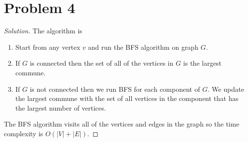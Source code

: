 \documentclass[12pt]{article}
\newenvironment*{solution}{\begin{proof}[Solution]}{\end{proof}}
\begin{document}
\section*{Problem 4}
\begin{solution}
    The algorithm is
    \begin{enumerate}
        \item Start from any vertex \(v\) and run the BFS algorithm on graph
        \(G\).
        \item If \(G\) is connected then the set of all of the vertices in
        \(G\) is the largest commune.
        \item If \(G\) is not connected then we run BFS for each component of
        \(G\). We update the largest commune with the set of all vertices in
        the component that has the largest number of vertices.
    \end{enumerate}
    The BFS algorithm visits all of the vertices and edges in the graph so the
    time complexity is \(O(|V|+|E|)\).
\end{solution}
\end{document}
